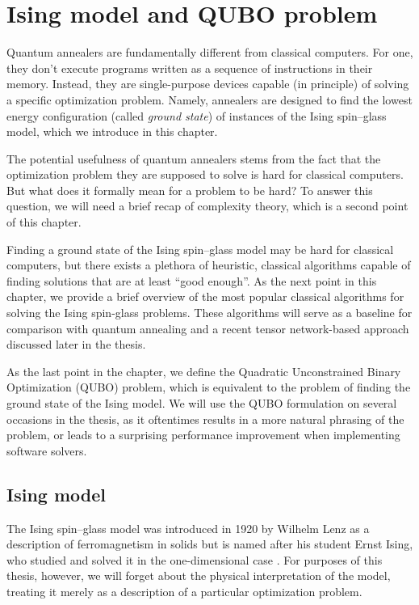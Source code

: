 \chapter{Ising model and QUBO problem}
\label{chapter:ising}

Quantum annealers are fundamentally different from classical computers. For
one, they don't execute programs written as a sequence of instructions in their
memory. Instead, they are single-purpose devices capable (in principle) of
solving a specific optimization problem. Namely, annealers are designed to find
the lowest energy configuration (called \emph{ground state}) of instances of
the Ising spin--glass model, which we introduce in this chapter.

The potential usefulness of quantum annealers stems from the fact that the
optimization problem they are supposed to solve is hard for classical
computers. But what does it formally mean for a problem to be hard? To answer
this question, we will need a brief recap of complexity theory, which is a
second point of this chapter.

Finding a ground state of the Ising spin--glass model may be hard for classical
computers, but there exists a plethora of heuristic, classical algorithms
capable of finding solutions that are at least ``good enough''. As the next
point in this chapter, we provide a brief overview of the most popular
classical algorithms for solving the Ising spin-glass problems. These
algorithms will serve as a baseline for comparison with quantum annealing and a
recent tensor network-based approach discussed later in the thesis.

As the last point in the chapter, we define the Quadratic Unconstrained Binary
Optimization (QUBO) problem, which is equivalent to the problem of finding the
ground state of the Ising model. We will use the QUBO formulation on several
occasions in the thesis, as it oftentimes results in a more natural phrasing of
the problem, or leads to a surprising performance improvement when implementing
software solvers.

\section{Ising model}

The Ising spin--glass model was introduced in 1920 by Wilhelm Lenz \cite{lenz}
as a description of ferromagnetism in solids but is named after his student
Ernst Ising, who studied and solved it in the one-dimensional case
\cite{ising}. For purposes of this thesis, however, we will forget about the
physical interpretation of the model, treating it merely as a description of a
particular optimization problem.


